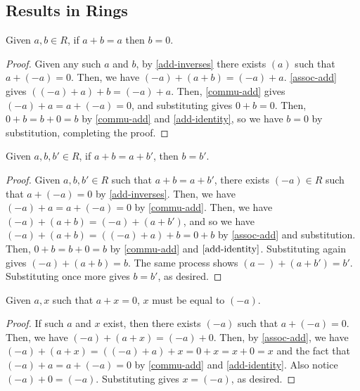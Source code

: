 \subsection{Results in Rings}

\begin{theorem}\label{local-add-identity-is-0}
    Given $a, b \in R$, if $a+b = a$ then $b=0$. 
\end{theorem}
\begin{proof}
    Given any such $a$ and $b$, by \ref{add-inverses} there exists $(a)$ such that $a + (-a) = 0$. Then, we have $(-a) + (a+b) = (-a) + a$. \ref{assoc-add} gives $( (-a) + a) + b = (-a) + a$. Then, \ref{commu-add} gives $(-a) + a = a + (-a) = 0$, and substituting gives $0 + b = 0$. Then, $0 + b = b+0 = b$ by \ref{commu-add} and \ref{add-identity}, so we have $b=0$ by substitution, completing the proof. 
\end{proof}

\begin{theorem}\label{add-left-cancel}
    Given $a, b, b' \in R$, if $a + b = a + b'$, then $b = b'$.
\end{theorem}
\begin{proof}
    Given $a, b, b' \in R$ such that $a+b = a+b'$, there exists $(-a) \in R$ such that $a + (-a) = 0$ by \ref{add-inverses}. Then, we have $(-a) + a = a + (-a) = 0$ by \ref{commu-add}. Then, we have $(-a) + (a+b) = (-a) + (a + b')$, and so we have $(-a) + (a+b) = ((-a)+a)+b = 0 + b$ by \ref{assoc-add} and substitution. Then, $0+b = b+0 = b$ by \ref{commu-add} and $\ref{add-identity}$. Substituting again gives $(-a) + (a+b) = b$. The same process shows $(a-) + (a+b') = b'$. Substituting once more gives $b = b'$, as desired.  
\end{proof}

\begin{theorem}\label{add-inverse-unique}
    Given $a, x$ such that $a+ x = 0$, $x$ must be equal to $(-a)$. 
\end{theorem}
\begin{proof} If such $a$ and $x$ exist, then there exists $(-a)$ such that $a + (-a) = 0$. Then, we have $(-a) + (a+ x) = (-a) + 0$. Then, by \ref{assoc-add}, we have $(-a) + (a+x) = ((-a)+a) + x = 0+x = x+0 = x$ and the fact that $(-a)+a = a + (-a) = 0$ by \ref{commu-add} and \ref{add-identity}. Also notice $(-a) + 0 = (-a)$. Substituting gives $x = (-a)$, as desired.
\end{proof}

